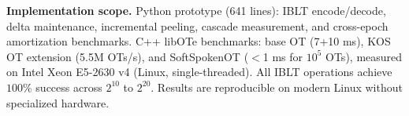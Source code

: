 \textbf{Implementation scope.} Python prototype (641 lines): IBLT encode/decode,
delta maintenance, incremental peeling, cascade measurement, and cross-epoch
amortization benchmarks. C++ libOTe benchmarks: base OT (7+10 ms), KOS OT
extension (5.5M OTs/s), and SoftSpokenOT ($<$1 ms for $10^5$ OTs), measured on
Intel Xeon E5-2630 v4 (Linux, single-threaded). \linebreak All IBLT operations achieve $100\%$
success across $2^{10}$ to $2^{20}$. Results are reproducible on modern Linux
without specialized hardware.

